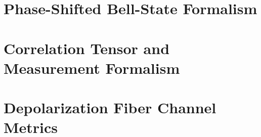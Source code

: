 \documentclass[a4paper,12pt]{report}
\begin{document}
\chapter{Phase-Shifted Bell-State Formalism}




\chapter{Correlation Tensor and Measurement Formalism}




\chapter{Depolarization Fiber Channel Metrics}




%
% 
%

%
% 
\end{document}
